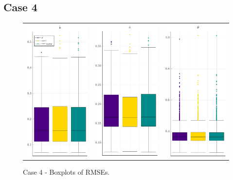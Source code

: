 \subsection{Case 4}
\begin{figure}[ht]
	\centering
	\begin{tabular}[b]{c c c}
		\includegraphics[width=.3\textwidth]{Figures/4/RMSE_b.pdf} & \includegraphics[width=.3\textwidth]{Figures/4/RMSE_a.pdf} & \includegraphics[width=.3\textwidth]{Figures/4/RMSE_t.pdf}
	\end{tabular}
\caption{Case 4 - Boxplots of RMSEs.}
	\label{fig:bpRMSE4}
\end{figure}
